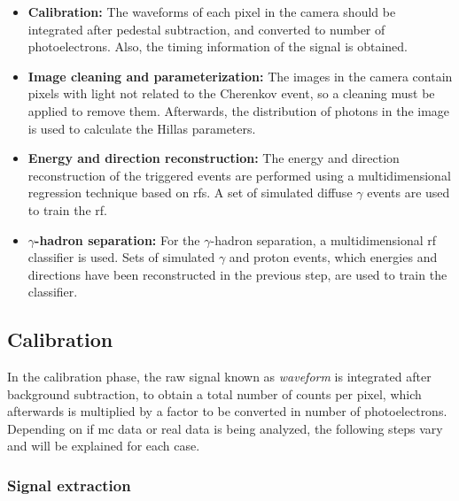 \documentclass[main.tex]{subfiles}
\begin{document}
\begin{itemize}
\item\textbf{Calibration:} The waveforms of each pixel in the camera should be integrated after pedestal subtraction, and converted to number of photoelectrons. Also, the timing information of the signal is obtained. 
\item\textbf{Image cleaning and parameterization:} The images in the camera contain pixels with light not related to the Cherenkov event, so a cleaning must be applied to remove them. Afterwards, the distribution of photons in the image is used to calculate the Hillas parameters.
\item\textbf{Energy and direction reconstruction:} The energy and direction reconstruction of the triggered events are performed using a multidimensional regression technique based on \glspl{rf}. A set of simulated diffuse $\gamma$ events are used to train the \gls{rf}. 
\item\textbf{$\gamma$-hadron separation:} For the $\gamma$-hadron separation, a multidimensional \gls{rf} classifier is used. Sets of simulated $\gamma$ and proton events, which energies and directions have been reconstructed in the previous step, are used to train the classifier.
\end{itemize}

\subsection{Calibration}

In the calibration phase, the raw signal known as \textit{waveform} is integrated after background subtraction, to obtain a total number of counts per pixel, which afterwards is multiplied by a factor to be converted in number of photoelectrons. Depending on if \gls{mc} data or real data is being analyzed, the following steps vary and will be explained for each case.

\subsubsection{Signal extraction} \label{sec:signalext}
\end{document}
